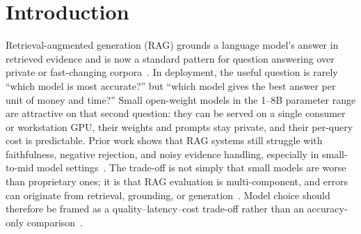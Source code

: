 
\section{Introduction}
\label{sec:intro}

Retrieval-augmented generation (RAG) grounds a language model's answer in
retrieved evidence and is now a standard pattern for question answering
over private or fast-changing corpora~\cite{lewis2020rag}. In deployment,
the useful question is rarely ``which model is most accurate?'' but
``which model gives the best answer per unit of money and time?'' Small
open-weight models in the 1--8B parameter range are attractive on that
second question: they can be served on a single consumer or workstation
GPU, their weights and prompts stay private, and their per-query cost is
predictable. Prior work shows that RAG systems still struggle with
faithfulness, negative rejection, and noisy evidence handling, especially
in small-to-mid model settings~\cite{mala2026faithfulness,chen2023rgb,zeng2025rare}.
The trade-off is not simply that small models are worse than proprietary
ones; it is that RAG evaluation is multi-component, and errors can
originate from retrieval, grounding, or generation~\cite{murugaraj2025ragvue}.
Model choice should therefore be framed as a quality--latency--cost
trade-off rather than an accuracy-only comparison~\cite{wu2024survey,sharma2025survey}.

